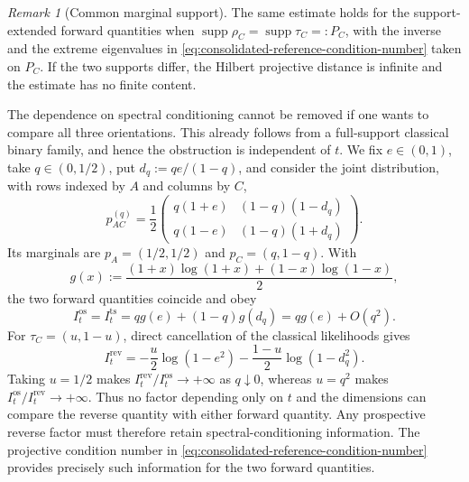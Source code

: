 \documentclass[11pt]{article}
\theoremstyle{remark}
\newtheorem{remark}[remark]{Remark}
\DeclareMathOperator{\os}{os}
\DeclareMathOperator{\ts}{ts}
\DeclareMathOperator{\rev}{rev}
\newcommand{\1}{\mathbbm{1}}
\begin{document}
\begin{remark}[Common marginal support]
The same estimate holds for the support-extended forward quantities
when
$\operatorname{supp}\rho_C=\operatorname{supp}\tau_C=:P_C$,
with the inverse and the extreme eigenvalues in
\eqref{eq:consolidated-reference-condition-number} taken on $P_C$.
If the two supports differ, the Hilbert projective distance is
infinite and the estimate has no finite content.
\end{remark}

The dependence on spectral conditioning cannot be removed if one
wants to compare all three orientations.  This already follows from
a full-support classical binary family, and hence the obstruction is
independent of $t$.  We fix $e\in(0,1)$, take $q\in(0,1/2)$, put
$d_q:=qe/(1-q)$, and consider the joint distribution, with rows
indexed by $A$ and columns by $C$,
\begin{equation}
 p_{AC}^{(q)}=\frac12
 \begin{pmatrix}
  q(1+e)&(1-q)(1-d_q)\\
  q(1-e)&(1-q)(1+d_q)
 \end{pmatrix}.
 \label{eq:consolidated-factor-counterexample}
\end{equation}
Its marginals are $p_A=(1/2,1/2)$ and $p_C=(q,1-q)$.  With
\begin{equation}
 g(x):=\frac{(1+x)\log(1+x)+(1-x)\log(1-x)}2,
\end{equation}
the two forward quantities coincide and obey
\begin{equation}
 I_t^{\os}=I_t^{\ts}
 =qg(e)+(1-q)g(d_q)=qg(e)+O(q^2).
 \label{eq:consolidated-factor-counterexample-forward}
\end{equation}
For $\tau_C=(u,1-u)$, direct cancellation of the classical
likelihoods gives
\begin{equation}
 I_t^{\rev}
 =-\frac u2\log(1-e^2)
  -\frac{1-u}{2}\log(1-d_q^2).
 \label{eq:consolidated-factor-counterexample-reverse}
\end{equation}
Taking $u=1/2$ makes
$I_t^{\rev}/I_t^{\os}\to+\infty$ as $q\downarrow0$, whereas
$u=q^2$ makes $I_t^{\os}/I_t^{\rev}\to+\infty$.  Thus no factor
depending only on $t$ and the dimensions can compare the reverse
quantity with either forward quantity.  Any prospective reverse
factor must therefore retain spectral-conditioning information.  The
projective condition number in
\eqref{eq:consolidated-reference-condition-number} provides precisely
such information for the two forward quantities.
\end{document}
